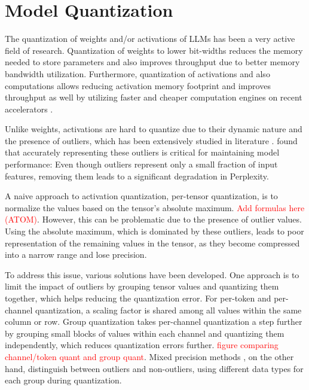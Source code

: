 \section{Model Quantization}
The quantization of weights and/or activations of LLMs \parencite{atom, awq,flexgen,gear, smoothquant, rptq, gptq} has been a very active field of research. Quantization of weights to lower bit-widths reduces the memory needed to store parameters and also improves throughput due to better memory bandwidth utilization. Furthermore, quantization of activations and also computations allows reducing activation memory footprint and improves throughput as well by utilizing faster and cheaper computation engines on recent accelerators \parencite{blackwell}. 

Unlike weights, activations are hard to quantize due to their dynamic nature \parencite{atom, flexgen} and the presence of outliers, which has been extensively studied in literature \parencite{llmint8, awq, smoothquant}. \cite{llmint8} found that accurately representing these outliers is critical for maintaining model performance: Even though outliers represent only a small fraction of input features, removing them leads to a significant degradation in Perplexity.

A naive approach to activation quantization, per-tensor quantization, is to normalize the values based on the tensor’s absolute maximum. \textcolor{red}{Add formulas here (ATOM)}. However, this can be problematic due to the presence of outlier values. Using the absolute maximum, which is dominated by these outliers, leads to poor representation of the remaining values in the tensor, as they become compressed into a narrow range and lose precision.

To address this issue, various solutions have been developed. One approach is to limit the impact of outliers by grouping tensor values and quantizing them together, which helps reducing the quantization error. For per-token and per-channel quantization, a scaling factor is shared among all values within the same column or row. Group quantization takes per-channel quantization a step further by grouping small blocks of values within each channel and quantizing them independently, which reduces quantization errors further. \textcolor{red}{figure comparing channel/token quant and group quant}.
Mixed precision methods \parencite{atom, llmint8, gear, kvquant}, on the other hand, distinguish between outliers and non-outliers, using different data types for each group during quantization. 

